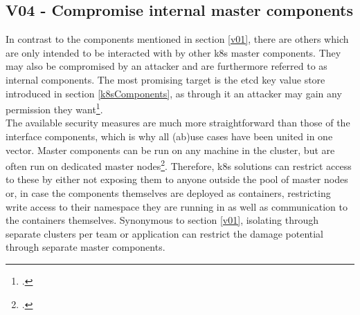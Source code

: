 \subsection{V04 - Compromise internal master components}
In contrast to the components mentioned in section \ref{v01}, there are others which are only intended to be interacted with by other \gls{k8s} master components. They may also be compromised by an attacker and are furthermore referred to as internal components.
The most promising target is the etcd key value store introduced in section \ref{k8sComponents}, as through it an attacker may gain any permission they want\footcite[][, chapter 'Running etcd Safely']{k8sBook}. \\
The available security measures are much more straightforward than those of the interface components, which is why all (ab)use cases have been united in one vector.
Master components can be run on any machine in the cluster, but are often run on dedicated master nodes\footcite[][, section 'Master Components']{k8sComponents}.
Therefore, \gls{k8s} solutions can restrict access to these by either not exposing them to anyone outside the pool of master nodes or, in case the components themselves are deployed as containers, restricting write access to their namespace they are running in as well as communication to the containers themselves.
Synonymous to section \ref{v01}, isolating through separate clusters per team or application can restrict the damage potential through separate master components.

